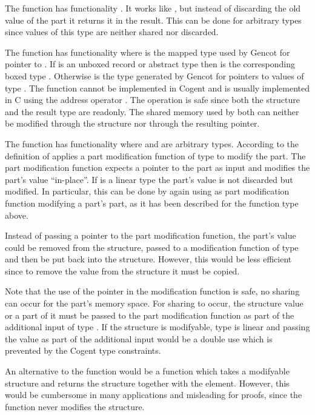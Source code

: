 The function  has functionality . It works like , but instead of
discarding the old value of the part it returns it in the result. This can be done for arbitrary types 
since values of this type are neither shared nor discarded.

The function  has functionality  where  is the mapped type used by Gencot
for pointer to . If  is an unboxed record or abstract type  then  is the
corresponding boxed type . Otherwise  is the type  generated by Gencot for pointers
to values of type . The function cannot be implemented in Cogent and is usually implemented in C using the address 
operator \code{\&}. The operation is safe since both the structure and the result type are readonly. The shared
memory used by both can neither be modified through the structure nor through the resulting pointer. 

The function  has functionality  where  and  are
arbitrary types.
According to the definition of   applies a part modification function of
type  to modify the part.
The part modification function expects a pointer to the part as input and modifies the part's value ``in-place''. If
 is a linear type the part's value is not discarded but modified. In particular, this can be done by
again using  as part modification function modifying a part's part, as it has been described
for the function type  above.

Instead of passing a pointer to the part modification function, the part's value could be removed from the structure,
passed to a modification function of type  and then be put back into the structure. However, this
would be less efficient since to remove the value from the structure it must be copied.

Note that the use of the pointer in the modification function is safe, no sharing can occur for the part's memory
space. For sharing to occur, the structure value or a part of it must be passed to the part modification function as
part of the additional input of type . If the structure is modifyable, type  is linear and passing 
the value as part of the additional input would be a double use which is prevented by the Cogent type constraints.

An alternative to the function  would be a function which takes a modifyable structure and returns the structure
together with the element. However, this would be cumbersome in many applications and misleading for proofs, since 
the function never modifies the structure. 


